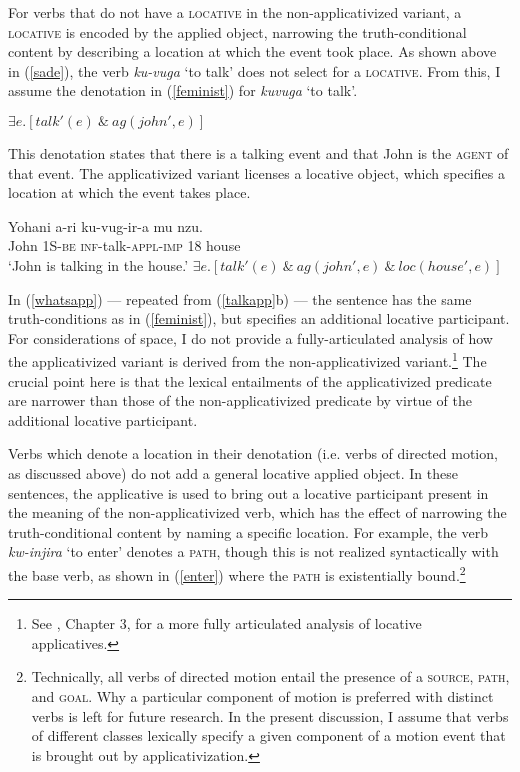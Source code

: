 \documentclass[output=paper]{langsci/langscibook}
\begin{document}
 For verbs that do not have a {\scshape locative} in the non-applicativized variant, a {\scshape locative} is encoded by the applied object, narrowing the truth-conditional content by describing a location at which the event took place. As shown above in (\ref{sade}), the verb \emph{ku-vuga} `to talk' does not select for a {\scshape locative}. From this, I assume the denotation in (\ref{feminist}) for \emph{kuvuga} `to talk'.
 			\begin{exe}
			\ex\label{feminist} $\exists e.[talk'(e)\ \&\ ag(john',e)]$
			\end{exe}
	This denotation states that there is a talking event and that John is the {\scshape agent} of that event. The applicativized variant licenses a locative object, which specifies a location at which the event takes place. 
		\begin{exe}
		\ex\begin{xlist}
		\ex\label{whatsapp}\gll Yohani a-ri ku-vug-ir-a mu nzu.\\
			John 1S-{\scshape be} {\scshape inf}-talk-{\scshape appl-imp} 18 house\\
				\glt `John is talking in the house.'
		\ex $\exists e.[talk'(e)\ \&\ ag(john',e)\ \&\ loc(house',e) ]$
	\end{xlist}
	\end{exe}
In (\ref{whatsapp}) --- repeated from (\ref{talkapp}b) --- the sentence has the same truth-conditions as in (\ref{feminist}), but specifies an additional locative participant. For considerations of space, I do not provide a fully-articulated analysis of how the applicativized variant is derived from the non-applicativized variant.\footnote{See \citet{jerro:2016}, Chapter 3, for a more fully articulated analysis of locative applicatives.} The crucial point here is that the lexical entailments of the applicativized predicate are narrower than those of the non-applicativized predicate by virtue of the additional locative participant.	

Verbs which denote a location in their denotation (i.e. verbs of directed motion, as discussed above) do not add a general locative applied object. In these sentences, the applicative is used to bring out a locative participant present in the meaning of the non-applicativized verb, which has the effect of narrowing the truth-conditional content by naming a specific location. For example, the verb \emph{kw-injira} `to enter' denotes a {\scshape path}, though this is not realized syntactically with the base verb, as shown in (\ref{enter}) where the {\scshape  path} is existentially bound.\footnote{Technically, all verbs of directed motion entail the presence of a {\scshape source, path,} and {\scshape goal}. Why a particular component of motion is preferred with distinct verbs is left for future research. In the present discussion, I assume that verbs of different classes lexically specify a given component of a motion event that is brought out by applicativization.}  %
\end{document}
